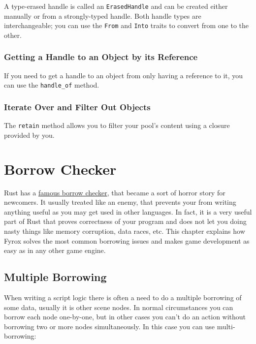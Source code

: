 \documentclass[
]{book}
\theoremstyle{definition}
\theoremstyle{definition}
\theoremstyle{definition}
\theoremstyle{definition}
\theoremstyle{remark}
\begin{document}
A type-erased handle is called an \texttt{ErasedHandle} and can be created either manually or from a strongly-typed handle. Both handle types are interchangeable; you can use the \texttt{From} and \texttt{Into} traits to convert from one to the other.

\subsubsection{Getting a Handle to an Object by its Reference}\label{getting-a-handle-to-an-object-by-its-reference}

If you need to get a handle to an object from only having a reference to it, you can use the \texttt{handle\_of} method.

\subsubsection{Iterate Over and Filter Out Objects}\label{iterate-over-and-filter-out-objects}

The \texttt{retain} method allows you to filter your pool's content using a closure provided by you.

\section{Borrow Checker}\label{borrow-checker}

Rust has a \href{https://doc.rust-lang.org/book/ch04-01-what-is-ownership.html}{famous borrow checker}, that became a sort of horror story for newcomers. It usually treated like an enemy, that prevents your from writing anything useful as you may get used in other languages. In fact, it is a very useful part of Rust that proves correctness of your program and does not let you doing nasty things like memory corruption, data races, etc. This chapter explains how Fyrox solves the most common borrowing issues and makes game development as easy as in any other game engine.

\subsection{Multiple Borrowing}\label{multiple-borrowing}

When writing a script logic there is often a need to do a multiple borrowing of some data, usually it is other scene nodes. In normal circumstances you can borrow each node one-by-one, but in other cases you can't do an action without borrowing two or more nodes simultaneously. In this case you can use multi-borrowing:
\end{document}
